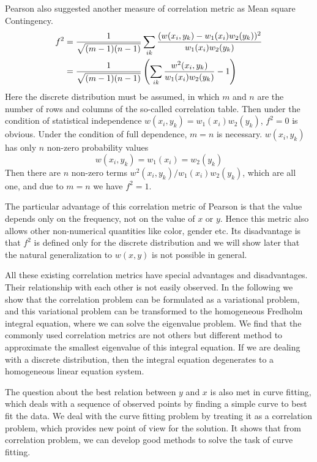 \documentclass{article}
\begin{document}
Pearson also suggested another measure of correlation metric as \textsf{Mean square Contingency}.
\begin{align}
   f^2 &= \frac{1}{\sqrt{(m-1)(n-1)}}\sum_{ik}
   \frac{(w(x_i,y_k)-w_1(x_i)w_2(y_k))^2}{w_1(x_i)w_2(y_k)} \notag \\
   &=\frac{1}{\sqrt{(m-1)(n-1)}}\left(\sum_{ik}
   \frac{w^2(x_i,y_k)}{w_1(x_i)w_2(y_k)} -1\right)
\end{align}
Here the discrete distribution must be assumed, in
which $m$ and $n$ are the number of rows and columns of the so-called correlation table. Then
under the condition of statistical independence $w(x_i,y_k) = w_1(x_i)w_2(y_k)$, $f^2=0$ is obvious.
Under the condition of full dependence, $m=n$ is necessary. $w(x_i,y_k)$ has only $n$ non-zero
probability values
$$
w(x_i, y_k) = w_1(x_i) = w_2(y_k)
$$
Then there are $n$ non-zero terms $w^2(x_i, y_k)/w_1(x_i)w_2(y_k)$, which are all one, and due
to $m=n$ we have $f^2=1$.

The particular advantage of this correlation metric
of Pearson is that the value depends only on the
frequency, not on the value of $x$ or $y$.
Hence this metric also allows other non-numerical
quantities like color, gender etc. Its disadvantage is
that $f^2$ is defined only for the discrete distribution and we will show later that the natural generalization to $w(x,y)$ is not possible in general.

All these existing correlation metrics have special
advantages and disadvantages. Their relationship with
each other is not easily observed. In the following
we show that the correlation problem can be formulated
as a variational problem, and this variational problem
can be transformed to the homogeneous Fredholm integral equation, where we can solve the eigenvalue problem.
We find that the commonly used correlation metrics are not others but different method to approximate the smallest eigenvalue of this integral equation.
If we are dealing with a discrete distribution, then the integral equation degenerates to a homogeneous linear equation system.

The question about the best relation between $y$ and
$x$ is also met in curve fitting, which deals with
a sequence of observed points by finding a simple curve
to best fit the data. We deal with the curve fitting problem by treating it as a correlation problem, which provides new point of view for the solution. It shows that from correlation problem, we can develop good methods to solve the task of curve fitting.
\end{document}
